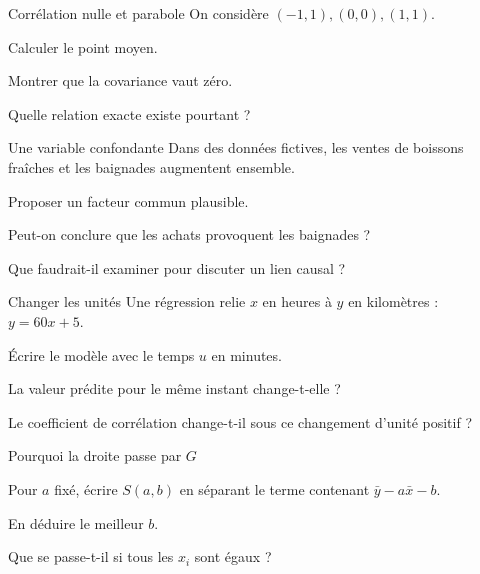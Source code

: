 \begingroup\renewcommand{\otBesoinPlace}[1]{}\begin{minipage}{\linewidth}
\begin{exercice}[3]{Corrélation nulle et parabole}
On considère $(-1,1),(0,0),(1,1)$.
\begin{questions}
\item Calculer le point moyen.
\item Montrer que la covariance vaut zéro.
\item Quelle relation exacte existe pourtant ?
\end{questions}
\end{exercice}
\begin{exercice}[3]{Une variable confondante}
Dans des données fictives, les ventes de boissons fraîches et les baignades augmentent ensemble.
\begin{questions}
\item Proposer un facteur commun plausible.
\item Peut-on conclure que les achats provoquent les baignades ?
\item Que faudrait-il examiner pour discuter un lien causal ?
\end{questions}
\end{exercice}
\begin{exercice}[3]{Changer les unités}
Une régression relie $x$ en heures à $y$ en kilomètres : $y=60x+5$.
\begin{questions}
\item Écrire le modèle avec le temps $u$ en minutes.
\item La valeur prédite pour le même instant change-t-elle ?
\item Le coefficient de corrélation change-t-il sous ce changement d’unité positif ?
\end{questions}
\end{exercice}
\begin{exercice}[3]{Pourquoi la droite passe par $G$}

\begin{questions}
\item Pour $a$ fixé, écrire $S(a,b)$ en séparant le terme contenant $\bar y-a\bar x-b$.
\item En déduire le meilleur $b$.
\item Que se passe-t-il si tous les $x_i$ sont égaux ?
\end{questions}
\end{exercice}
\end{minipage}\endgroup
